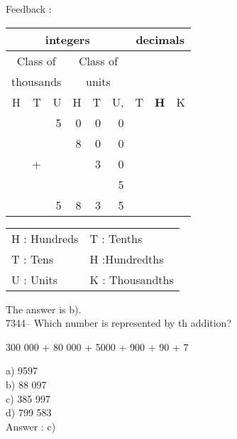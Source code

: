 \documentclass[letterpaper, 12pt]{article}
\begin{document}
Feedback :\\
\begin{center}
\begin{tabular}{|rrr|rrr|rrr|}
\hline
\multicolumn{6}{|c|}{integers} &\multicolumn{3}{|c|}{decimals} \\
\hline
\multicolumn{3}{|c|}{Class of} &\multicolumn{3}{|c|}{Class of} &  \multicolumn{3}{c|}{} \\
\multicolumn{3}{|c|}{thousands} &\multicolumn{3}{|c|}{units} &  \multicolumn{3}{c|}{} \\
\hline
H & T & U &H & T & U, & T\up{th} & \textbf{H\up{th}} & K\up{th} \\
\hline
\hline
 &   & 5 & 0 & 0 & 0 & & &\\
 &   &   & 8 & 0 & 0 & & &\\
 & + &   &   & 3 & 0 & & &\\
 &   &   &   &   & 5 & & &\\
\hline
\hline
 &   & 5 & 8 & 3 & 5 & & &\\
\hline
\end{tabular}
\end{center}

\scriptsize
\begin{center}
\begin{tabular}{ll}
H : Hundreds & T\up{th} : Tenths\\
T : Tens & H\up{th} :Hundredths\\
U : Units & K\up{e} : Thousandths\\
\end{tabular}
\end{center}

\normalsize
The answer is b).\\

7344-- Which number is represented by th addition?\\
\begin{center}
300 000 + 80 000 + 5000 + 900 + 90 + 7
\end{center}

a) 9597\\
b) 88 097\\
c) 385 997\\
d) 799 583\\

Answer : c)\\
\end{document}
